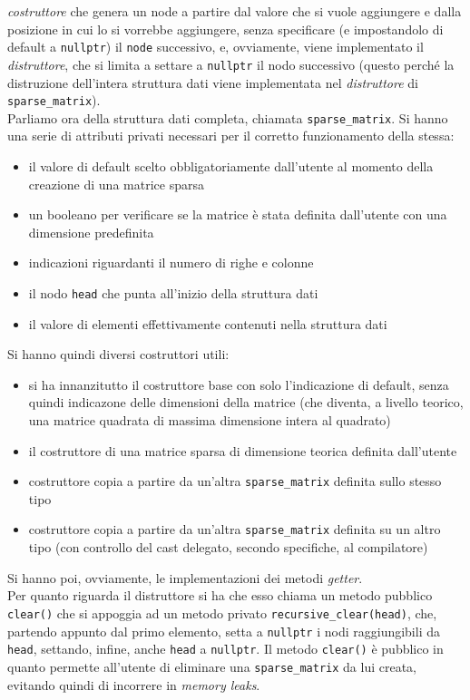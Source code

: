 \documentclass[a4paper,12pt, oneside]{article}
\begin{document}
\textit{costruttore} che genera un node a partire dal valore che si vuole
aggiungere e dalla posizione in cui lo si vorrebbe aggiungere, senza
specificare (e impostandolo di default a \texttt{nullptr}) il
\texttt{node} successivo, e, ovviamente, viene implementato il
\textit{distruttore}, che si limita a settare a \texttt{nullptr} il
nodo successivo (questo perché la distruzione dell'intera struttura
dati viene implementata nel \textit{distruttore} di
\texttt{sparse\_matrix}).\\
Parliamo ora della struttura dati completa, chiamata
\texttt{sparse\_matrix}. Si hanno una serie di attributi privati
necessari per il corretto funzionamento della stessa:
\begin{itemize}
  \item il valore di default scelto obbligatoriamente dall'utente al
  momento della creazione di una matrice sparsa
  \item un booleano per verificare se la matrice è stata definita
  dall'utente con una dimensione predefinita
  \item indicazioni riguardanti il numero di righe e colonne
  \item il nodo \texttt{head} che punta all'inizio della struttura
  dati
  \item il valore di elementi effettivamente contenuti nella struttura dati
\end{itemize}
Si hanno quindi diversi costruttori utili:
\begin{itemize}
  \item si ha innanzitutto il costruttore base con solo l'indicazione
  di default, senza quindi indicazone delle dimensioni della matrice
  (che diventa, a livello teorico, una matrice quadrata di massima
  dimensione intera al quadrato)
  \item il costruttore di una matrice sparsa di dimensione teorica
  definita dall'utente
  \item costruttore copia a partire da un'altra
  \texttt{sparse\_matrix} definita sullo stesso tipo
  \item costruttore copia a partire da un'altra
  \texttt{sparse\_matrix} definita su un altro tipo (con controllo del
  cast delegato, secondo specifiche, al compilatore)
\end{itemize}
Si hanno poi, ovviamente, le implementazioni dei metodi
\textit{getter}.\\
Per quanto riguarda il distruttore si ha che esso chiama un metodo
pubblico \texttt{clear()} che si appoggia ad un metodo privato
\texttt{recursive\_clear(head)}, che, partendo appunto dal primo
elemento, setta a \texttt{nullptr} i nodi raggiungibili da
\texttt{head}, settando, infine, anche \texttt{head} a
\texttt{nullptr}. Il metodo \texttt{clear()} è pubblico in quanto
permette all'utente di eliminare una \texttt{sparse\_matrix} da lui
creata, evitando quindi di incorrere in \textit{memory leaks}.
\newpage
\end{document}
